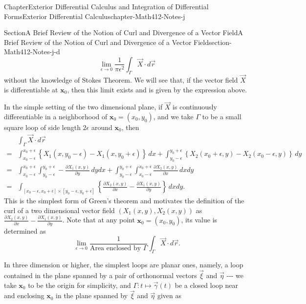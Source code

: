 \documentclass[oneside,10pt,]{book}
\numberwithin{equation}{section}
\newcommand{\bx}{\mathbf{x}}
\newcommand{\amp}{&}
\begin{document}
\begin{chapterptx}{Chapter}{Exterior Differential Calculus and Integration of Differential Forms}{}{Exterior Differential Calculus}{}{}{chapter-Math412-Notes-j}
\begin{sectionptx}{Section}{A Brief Review of the Notion of Curl and Divergence of a Vector Field}{}{A Brief Review of the Notion of Curl and Divergence of a Vector Field}{}{}{section-Math412-Notes-j-d}
\begin{equation*}
\lim_{\epsilon \to 0} \frac{1}{\pi \epsilon^{2}} \int_{\Gamma} \vec{X}\cdot d\vec{r}
\end{equation*}
without the knowledge of Stokes Theorem. We will see  that, if the vector field \(\vec{X}\) is differentiable at \(\bx_{0}\), then  this limit exists and is given by the expression above.%
\par
In the simple setting of the two dimensional plane, if \(\vec{X}\) is continuously differentiable in a neighborhood of \({\mathbf x}_{0}=(x_{0}, y_{0})\), and we take \(\Gamma\) to be a small square loop of side length \(2\epsilon\) around \({\mathbf x}_{0}\), then%
\begin{align*}
\amp \int_{\Gamma} \vec{X}\cdot d\vec{r} \\
= \amp
\int_{x_{0}-\epsilon}^{x_{0}+\epsilon} \left\{X_{1}(x, y_{0}-\epsilon)- X_{1}(x, y_{0}+\epsilon)\right\}\, dx
+ \int_{y_{0}-\epsilon}^{y_{0}+\epsilon} \left\{X_{2}(x_{0}+\epsilon, y)-X_{2}(x_{0}-\epsilon, y)\right\}\, dy\\
= \amp 
\int_{x_{0}-\epsilon}^{x_{0}+\epsilon} \int_{y_{0}-\epsilon}^{y_{0}+\epsilon} 
- \frac{\partial X_{1}(x, y)}{\partial y} \, dy dx +
\int_{y_{0}-\epsilon}^{y_{0}+\epsilon} \int_{x_{0}-\epsilon}^{x_{0}+\epsilon} 
\frac{\partial X_{2}(x, y)}{\partial x} \, dx dy\\
= \amp \int_{[x_{0}-\epsilon, x_{0}+\epsilon] \times [y_{0}-\epsilon, y_{0}+\epsilon]}
\left\{  \frac{\partial X_{2}(x, y)}{\partial x}- \frac{\partial X_{1}(x, y)}{\partial y}\right\}\, dx dy.
\end{align*}
This is the simplest form of Green's theorem and motivates the definition of the curl of a two dimensional vector field \((X_{1}(x, y), X_{2}(x, y))\) as \(\frac{\partial X_{2}(x, y)}{\partial x}- \frac{\partial X_{1}(x, y)}{\partial y}\). Note that at any point \({\mathbf x}_{0}=(x_{0}, y_{0})\), its value is determined as%
\begin{equation*}
\lim_{\epsilon\to 0}\frac{1}{\text{Area enclosed by } \Gamma} \int_{\Gamma} \vec{X}\cdot d\vec{r}.
\end{equation*}
%
\par
In three dimension or higher, the simplest loops are planar ones, namely, a loop contained in the plane spanned by  a pair of orthonormal vectors \(\vec{\xi}\) and \(\vec{\eta}\) -{}-{}- we take \({\mathbf x}_{0}\) to be the origin for simplicity, and \(\Gamma: t\mapsto \vec{\gamma}(t)\) be a closed loop near and enclosing \({\mathbf x}_{0}\) in the plane spanned by \(\vec{\xi}\) and \(\vec{\eta}\)  given as%

\end{sectionptx}
\end{chapterptx}
\end{document}
